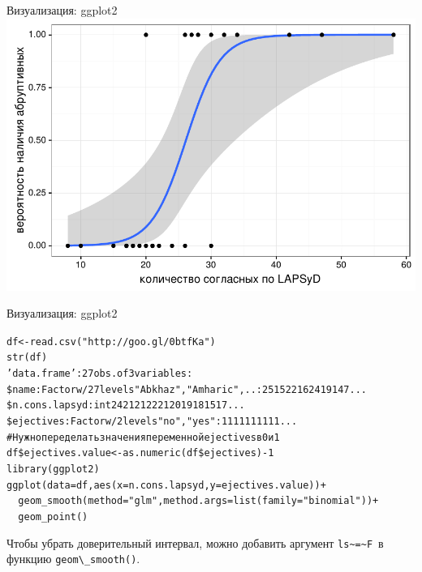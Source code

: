 \begin{frame}{Визуализация: ggplot2}
\includegraphics[width=\linewidth]{ejectivessigmoid.pdf}
\end{frame}
\begin{frame}{Визуализация: ggplot2}
\scriptsize
\begin{alltt}
df <- read.csv("http://goo.gl/0btfKa")\medskip\\
\alert{str(df)}\\
'data.frame':	27 obs. of  3 variables:\\
\$ name: \alert{Factor} w/ 27 levels "Abkhaz"{},"Amharic"{},..: 25 15 22 16 24 19 14 7 ...\\
 \$ n.cons.lapsyd: \alert{int}  24 21 21 22 21 20 19 18 15 17 ...\\
\$ ejectives: \alert{Factor} w/ 2 levels "no"{},"yes"{}: 1 1 1 1 1 1 1 1 1 1 ...\medskip\\
\# Нужно переделать значения переменной ejectives в 0 и 1\\
df\$ejectives.value <- \alert{as.numeric(}df\$ejectives\alert{) - 1}\medskip\\
library(ggplot2)\\
ggplot(data = df, aes(x = n.cons.lapsyd, y = ejectives.value))+\\
~~\alert{geom\_smooth(method = "glm"{}, method.args = list(family = "binomial"))} +\\
~~geom\_point() \bigskip\\
\end{alltt}
\normalsize
Чтобы убрать доверительный интервал, можно добавить аргумент \scriptsize\alert{\verb"ls~=~F"}\normalsize\ в функцию \scriptsize\verb"geom\_smooth()"\normalsize.
\end{frame}
